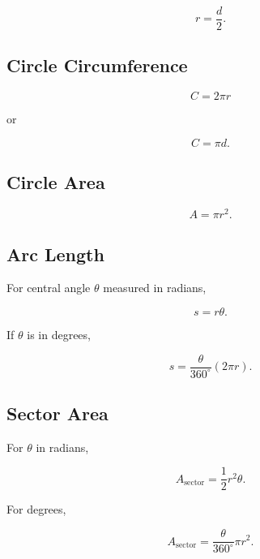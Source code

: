\[
\boxed{
r=\frac{d}{2}.
}
\]

\subsection{Circle Circumference}
\label{subsec:circle-circumference-reference}

\[
\boxed{
C
=
2\pi r
}
\]

or

\[
\boxed{
C
=
\pi d.
}
\]

\subsection{Circle Area}
\label{subsec:circle-area-reference}

\[
\boxed{
A
=
\pi r^2.
}
\]

\subsection{Arc Length}
\label{subsec:arc-length-circle-reference}

For central angle \(\theta\) measured in radians,

\[
\boxed{
s
=
r\theta.
}
\]

If \(\theta\) is in degrees,

\[
\boxed{
s
=
\frac{\theta}{360^\circ}
(2\pi r).
}
\]

\subsection{Sector Area}
\label{subsec:sector-area-reference}

For \(\theta\) in radians,

\[
\boxed{
A_{\mathrm{sector}}
=
\frac12r^2\theta.
}
\]

For degrees,

\[
\boxed{
A_{\mathrm{sector}}
=
\frac{\theta}{360^\circ}
\pi r^2.
}
\]

